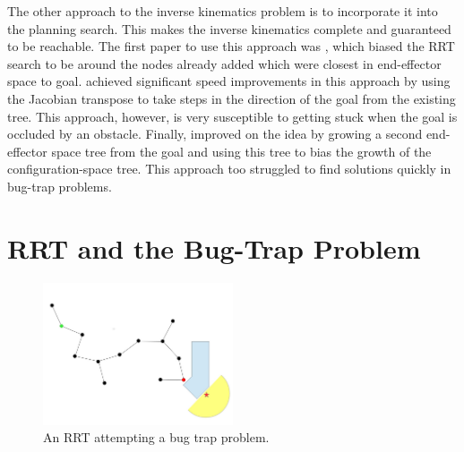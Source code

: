 \documentclass[conference]{IEEEtran}
\begin{document}
The other approach to the inverse kinematics problem is to incorporate it into the planning search. This makes the inverse kinematics
complete and guaranteed to be reachable. The first paper to use this approach was \cite{bertram06}, which biased the RRT search to be around
the nodes already added which were closest in end-effector space to goal. \cite{vande07} achieved significant speed improvements in this
approach by using the Jacobian transpose to take steps in the direction of the goal from the existing tree. This approach, however, is very
susceptible to getting stuck when the goal is occluded by an obstacle. Finally, \cite{diankov08} improved on the idea by growing a second
end-effector space tree from the goal and using this tree to bias the growth of the configuration-space tree. This approach too struggled
to find solutions quickly in bug-trap problems.
 
\section{RRT and the Bug-Trap Problem}

\begin{figure}[h!]
  \centering
    \includegraphics[width=0.5\textwidth]{figures/bugTrapRRT.jpg}
  \caption{An RRT attempting a bug trap problem. \label{fig:BugTrapRRT} }
\end{figure}
\end{document}
